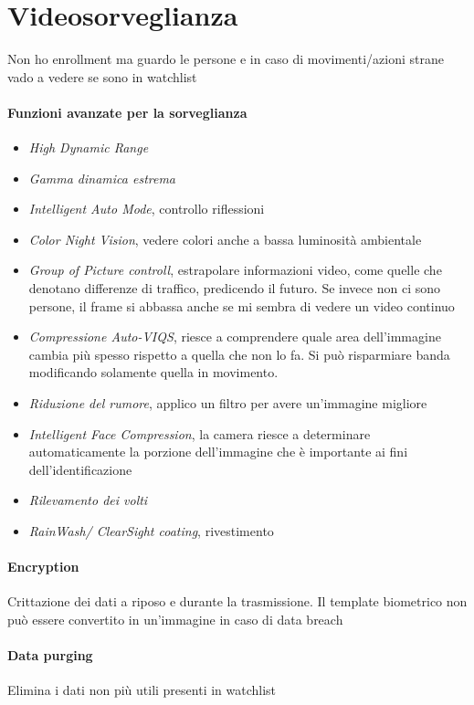 \section{Videosorveglianza}
Non ho enrollment ma guardo le persone e in caso di movimenti/azioni strane vado a vedere se sono in watchlist

\paragraph{Funzioni avanzate per la sorveglianza}
\begin{itemize}
    \item \textit{High Dynamic Range}
    \item \textit{Gamma dinamica estrema}
    \item \textit{Intelligent Auto Mode}, controllo riflessioni
    \item \textit{Color Night Vision}, vedere colori anche a bassa luminosità ambientale
    \item \textit{Group of Picture controll}, estrapolare informazioni video, come quelle che denotano differenze di traffico, predicendo il futuro. Se invece non ci sono persone, il frame si abbassa anche se mi sembra di vedere un video continuo
    \item \textit{Compressione Auto-VIQS}, riesce a comprendere quale area dell’immagine cambia più spesso rispetto a quella che non lo fa. Si può risparmiare banda modificando solamente quella in movimento.
    \item \textit{Riduzione del rumore}, applico un filtro per avere un’immagine migliore
    \item \textit{Intelligent Face Compression}, la camera riesce a determinare automaticamente la porzione dell’immagine che è importante ai fini dell'identificazione
    \item \textit{Rilevamento dei volti}
    \item \textit{RainWash/ ClearSight coating}, rivestimento
\end{itemize}

\paragraph{Encryption} 
Crittazione dei dati a riposo e durante la trasmissione. Il template biometrico non può essere convertito in un’immagine in caso di data breach

\paragraph{Data purging}
Elimina i dati non più utili presenti in watchlist

\newpage